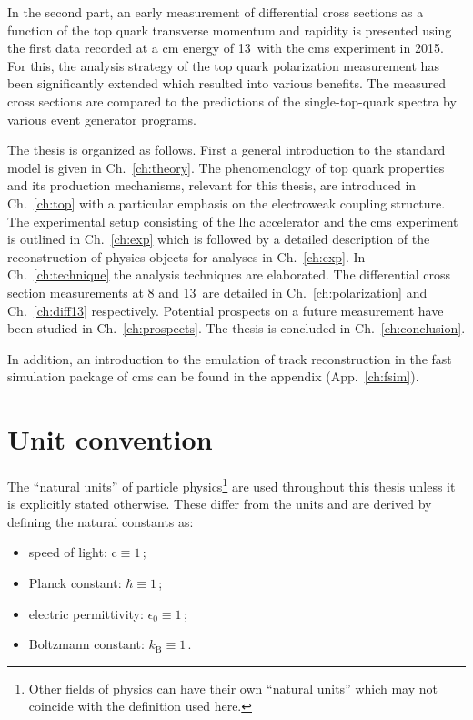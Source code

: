 In the second part, an early measurement of differential cross sections as a function of the top quark transverse momentum and rapidity is presented using the first data recorded at a \acrlong{cm} energy of 13~\TeV with the \gls{cms} experiment in 2015. For this, the analysis strategy of the top quark polarization measurement has been significantly extended which resulted into various benefits. The measured cross sections are compared to the predictions of the single-top-quark spectra by various event generator programs.

The thesis is organized as follows. First a general introduction to the standard model is given in Ch.~\ref{ch:theory}. The phenomenology of top quark properties and its production mechanisms, relevant for this thesis, are introduced in Ch.~\ref{ch:top} with a particular emphasis on the electroweak coupling structure. The experimental setup consisting of the \gls{lhc} accelerator and the \gls{cms} experiment is outlined in Ch.~\ref{ch:exp} which is followed by a detailed description of the reconstruction of physics objects for analyses in Ch.~\ref{ch:exp}. In Ch.~\ref{ch:technique} the analysis techniques are elaborated. The differential cross section measurements at 8 and 13~\TeV are detailed in Ch.~\ref{ch:polarization} and Ch.~\ref{ch:diff13} respectively. Potential prospects on a future measurement have been studied in Ch.~\ref{ch:prospects}. The thesis is concluded in Ch.~\ref{ch:conclusion}.

In addition, an introduction to the emulation of track reconstruction in the fast simulation package of \gls{cms} can be found in the appendix (App.~\ref{ch:fsim}).

\section*{Unit convention}

The ``natural units'' of particle physics\footnote{Other fields of physics can have their own ``natural units'' which may not coincide with the definition used here.} are used throughout this thesis unless it is explicitly stated otherwise. These differ from the  units and are derived by defining the natural constants as:

\begin{itemize}
\item speed of light: $\mathrm{c}\equiv 1$\,;
\item Planck constant: $\hbar\equiv 1$\,;
\item electric permittivity: $\epsilon_{0}\equiv 1$\,;
\item Boltzmann constant: $k_\mathrm{B}\equiv 1$\,.
\end{itemize}

